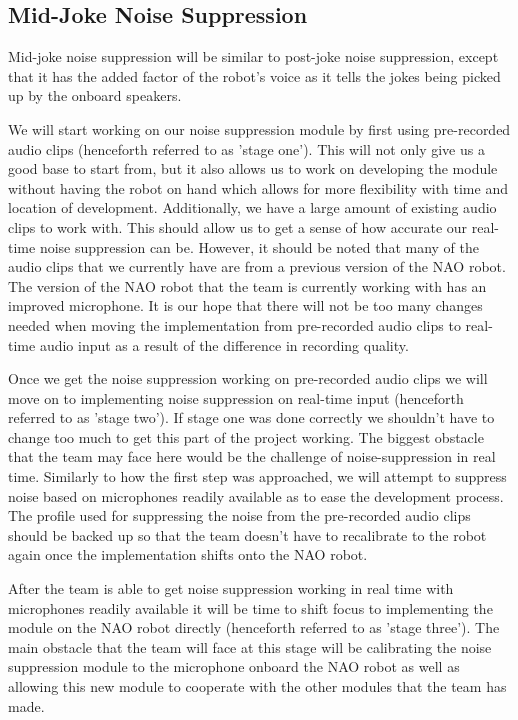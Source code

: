 \documentclass[onecolumn, draftclsnofoot,10pt, compsoc]{IEEEtran}
\begin{document}
\subsection{Mid-Joke Noise Suppression}
Mid-joke noise suppression will be similar to post-joke noise suppression, except that it has the added factor of the robot's voice as it tells the jokes being picked up by the onboard speakers.\par
\vspace{.3cm}
\noindent We will start working on our noise suppression module by first using pre-recorded audio clips (henceforth referred to as 'stage one'). This will not only give us a good base to start from, but it also allows us to work on developing the module without having the robot on hand which allows for more flexibility with time and location of development. Additionally, we have a large amount of existing audio clips to work with. This should allow us to get a sense of how accurate our real-time noise suppression can be. However, it should be noted that many of the audio clips that we currently have are from a previous version of the NAO robot. The version of the NAO robot that the team is currently working with has an improved microphone. It is our hope that there will not be too many changes needed when moving the implementation from pre-recorded audio clips to real-time audio input as a result of the difference in recording quality.\par
\vspace{.3cm}
\noindent Once we get the noise suppression working on pre-recorded audio clips we will move on to implementing noise suppression on real-time input (henceforth referred to as 'stage two'). If stage one was done correctly we shouldn't have to change too much to get this part of the project working. The biggest obstacle that the team may face here would be the challenge of noise-suppression in real time. Similarly to how the first step was approached, we will attempt to suppress noise based on microphones readily available as to ease the development process. The profile used for suppressing the noise from the pre-recorded audio clips should be backed up so that the team doesn't have to recalibrate to the robot again once the implementation shifts onto the NAO robot.\par
\vspace{.3cm}
\noindent After the team is able to get noise suppression working in real time with microphones readily available it will be time to shift focus to implementing the module on the NAO robot directly (henceforth referred to as 'stage three'). The main obstacle that the team will face at this stage will be calibrating the noise suppression module to the microphone onboard the NAO robot as well as allowing this new module to cooperate with the other modules that the team has made.
\end{document}
